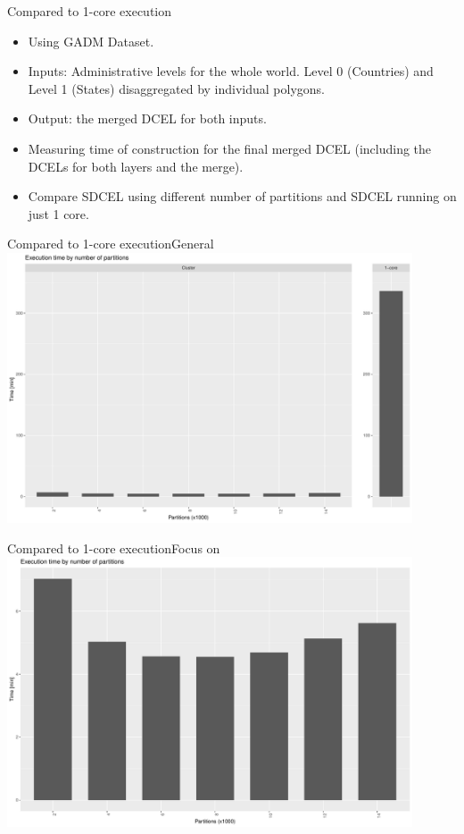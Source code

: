 \documentclass{beamer}
\begin{document}
\begin{frame}{Compared to 1-core execution}
    \begin{itemize}
        \item Using GADM Dataset.
        \item Inputs: Administrative levels for the whole world.  Level 0 (Countries) and Level 1 (States) disaggregated by individual polygons.
        \item Output: the merged DCEL for both inputs.
        \item Measuring time of construction for the final merged DCEL (including the DCELs for both layers and the merge).
        \item Compare SDCEL using different number of partitions and SDCEL running on just 1 core.
    \end{itemize}
\end{frame}
\begin{frame}{Compared to 1-core execution}{General}
    \centering 
    \includegraphics[width=0.9\textwidth]{figures/gadm.pdf}
\end{frame}
\begin{frame}{Compared to 1-core execution}{Focus on}
    \centering 
    \includegraphics[width=0.9\textwidth]{figures/gadm_sample.pdf}
\end{frame}
\end{document}
